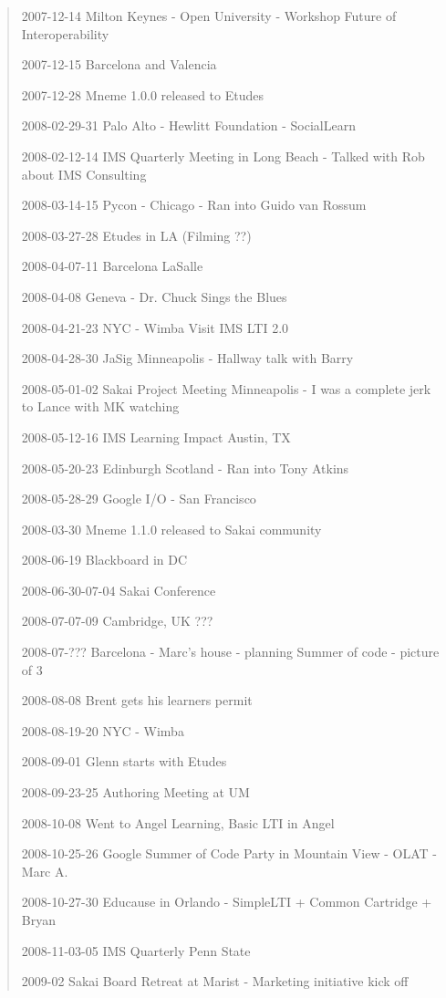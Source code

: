 \begin{quote}
2007-12-14 Milton Keynes - Open University - Workshop 
Future of Interoperability

2007-12-15 Barcelona and Valencia

2007-12-28 Mneme 1.0.0 released to Etudes

2008-02-29-31 Palo Alto - Hewlitt Foundation - SocialLearn

2008-02-12-14 IMS Quarterly Meeting in Long Beach - Talked with Rob about IMS Consulting

2008-03-14-15 Pycon - Chicago - Ran into Guido van Rossum

2008-03-27-28 Etudes in LA (Filming ??)

2008-04-07-11 Barcelona LaSalle

2008-04-08 Geneva - Dr. Chuck Sings the Blues

2008-04-21-23 NYC - Wimba Visit IMS LTI 2.0

2008-04-28-30 JaSig Minneapolis - Hallway talk with Barry 

2008-05-01-02 Sakai Project Meeting Minneapolis - I was a complete jerk to Lance with MK watching

2008-05-12-16 IMS Learning Impact Austin, TX

2008-05-20-23 Edinburgh Scotland - Ran into Tony Atkins

2008-05-28-29 Google I/O - San Francisco

2008-03-30 Mneme 1.1.0 released to Sakai community

2008-06-19 Blackboard in DC

2008-06-30-07-04 Sakai Conference

2008-07-07-09  Cambridge, UK ???

2008-07-??? Barcelona - Marc's house - planning Summer of code - picture of 3

2008-08-08 Brent gets his learners permit

2008-08-19-20 NYC - Wimba

2008-09-01 Glenn starts with Etudes

2008-09-23-25 Authoring Meeting at UM

2008-10-08 Went to Angel Learning, Basic LTI in Angel

2008-10-25-26 Google Summer of Code Party in Mountain View - OLAT - Marc A.

2008-10-27-30 Educause in Orlando - SimpleLTI + Common Cartridge + Bryan

2008-11-03-05 IMS Quarterly Penn State

2009-02 Sakai Board Retreat at Marist - Marketing initiative kick off


\end{quote}
